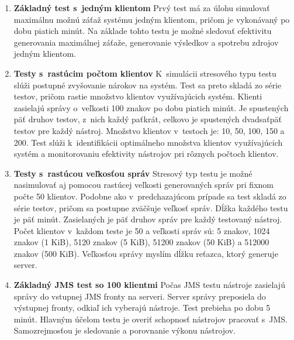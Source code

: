 \documentclass[12pt,oneside,final]{fithesis-utf8}
\begin{document}
\begin{enumerate}

\item \textbf{Základný test s~jedným klientom}
\newline
Prvý test má za úlohu simulovať maximálnu možnú záťaž systému jedným klientom, pričom je vykonávaný po dobu piatich minút. Na základe tohto testu je možné sledovať efektivitu generovania maximálnej záťaže, generovanie výsledkov a spotrebu zdrojov jedným klientom.
\newline

\item \textbf{Testy s~rastúcim počtom klientov}
\newline
K~simulácii stresového typu testu slúži postupné zvyšovanie nárokov na systém. Test sa preto skladá zo série testov, pričom rastie množstvo klientov využívajúcich systém. Klienti zasielajú správy o~veľkosti 100 znakov po dobu piatich minút. Je spustených päť druhov testov, z~nich každý paťkrát, celkovo je spustených dvadsaťpäť testov pre každý nástroj. Množstvo klientov v~testoch je: 10, 50, 100, 150 a 200. Test slúži k~identifikácii optimálneho množstva klientov využívajúcich systém a monitorovaniu efektivity nástrojov pri rôznych počtoch klientov.
\newline

\item \textbf{Testy s~rastúcou veľkosťou správ}
\newline
Stresový typ testu je možné nasimulovať aj pomocou rastúcej veľkosti generovaných správ pri fixnom počte 50 klientov. Podobne ako v~predchazajúcom prípade sa test skladá zo série testov, pričom sa postupne zväčšuje veľkosť správ. Dĺžka každého testu je päť minút. Zasielaných je päť druhov správ pre každý testovaný nástroj. Počet klientov v~každom teste je 50 a veľkosti  správ sú: 5 znakov, 1024 znakov (1 KiB), 5120 znakov (5 KiB), 51200 znakov (50 KiB) a 512000 znakov (500 KiB). Veľkosťou správy myslím dĺžku reťazca, ktorý generuje server.
\newline

\item \textbf{Základný JMS test so 100 klientmi}
\newline
Počas JMS testu nástroje zasielajú správy do vstupnej JMS fronty na serveri. Server správy preposiela do výstupnej fronty, odkiaľ ich vyberajú nástroje. Test prebieha po dobu 5 minút. Hlavným účelom testu je overiť schopnosť nástrojov pracovať s~JMS. Samozrejmosťou je sledovanie a porovnanie výkonu nástrojov.
\newline


\end{enumerate}
\end{document}
